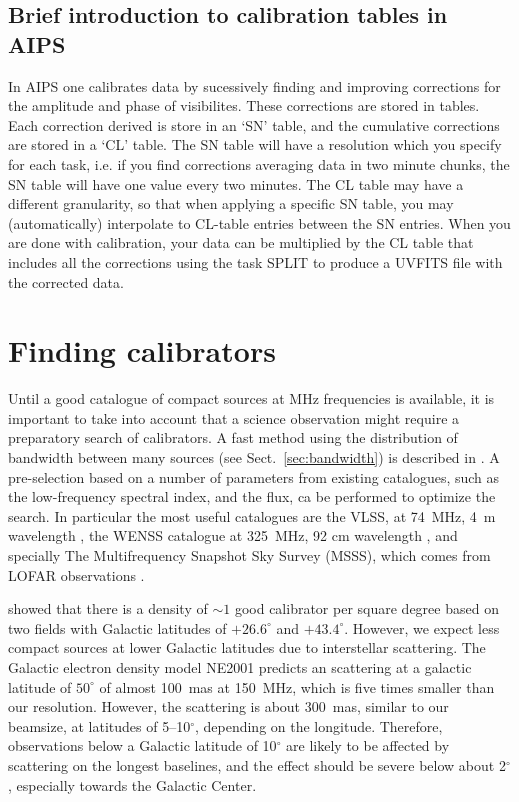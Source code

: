 \documentclass[graybox]{svmult}
\begin{document}
\subsection{Brief introduction to calibration tables in AIPS}\label{sec:aips}

In AIPS one calibrates data by sucessively finding and improving corrections
for the amplitude and phase of visibilites. These corrections are stored in
tables.  Each correction derived is store in an `SN' table, and the cumulative
corrections are stored in a `CL' table. The SN table will have a resolution
which you specify for each task, i.e. if you find corrections averaging data in
two minute chunks, the SN table will have one value every two minutes. The CL
table may have a different granularity, so that when applying a specific SN
table, you may (automatically) interpolate to CL-table entries between the SN
entries. When you are done with calibration, your data can be multiplied by the
CL table  that includes all the corrections using the task SPLIT to produce a
UVFITS file with the corrected data.

\section{Finding calibrators}\label{findcalib}

Until a good catalogue of compact sources at MHz frequencies is available, it
is important to take into account that a science observation might require a
preparatory search of calibrators. A fast method using the distribution of
bandwidth between many sources (see Sect.~\ref{sec:bandwidth}) is described in
\cite{moldon15}. A pre-selection based on a number of parameters from existing
catalogues, such as the low-frequency spectral index, and the flux, ca be
performed to optimize the search. In particular the most useful catalogues are
the VLSS, at 74~MHz, 4~m wavelength \citep{lane12a}, the WENSS catalogue at
325~MHz, 92 cm wavelength \citep{rengelink97}, and specially The Multifrequency
Snapshot Sky Survey (MSSS), which comes from LOFAR observations
\citep{heald14}. 

\cite{moldon15} showed that there is a density of $\sim1$ good calibrator per
square degree based on two fields with Galactic latitudes of $+26.6^{\circ}$
and $+43.4^{\circ} $. However, we expect less compact sources at lower Galactic
latitudes due to interstellar scattering. The Galactic electron density model
NE2001 \citep{cordes02} predicts an scattering at a galactic latitude of
$50^{\circ}$ of almost 100~mas at 150~MHz, which is five times smaller than our
resolution. However, the scattering is about 300~mas, similar to our beamsize,
at latitudes of 5--10$^{\circ}$, depending on the longitude. Therefore,
observations below a Galactic latitude of 10$^{\circ}$ are likely to be
affected by scattering on the longest baselines, and the effect should be
severe below about 2$^{\circ}$, especially towards the Galactic Center. 
\end{document}
